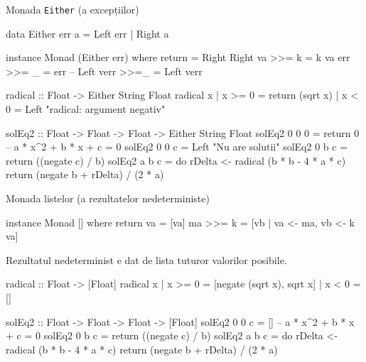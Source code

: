 \documentclass[xcolor=x11names,compress,10pt]{beamer}
\newcommand{\li}[1]{\lstinline$#1$}
\begin{document}
\begin{frame}[fragile]{Monada \li{Either} (a excepțiilor)}

\begin{asciihs}
data Either err a = Left err | Right a
\end{asciihs}

\pause

\begin{asciihs}
instance Monad (Either err) where
  return = Right
  Right va >>= k  = k va
  err     >>= _  = err   -- Left verr >>=_ = Left verr
\end{asciihs}

\pause

\begin{asciihs}
radical :: Float -> Either String Float
radical x | x >= 0 = return (sqrt x)
          | x < 0  = Left "radical: argument negativ"

solEq2 :: Float -> Float -> Float -> Either String Float
solEq2 0 0 0 = return 0          -- a * x^2 + b * x + c = 0
solEq2 0 0 c = Left "Nu are solutii"
solEq2 0 b c = return ((negate c) / b)
solEq2 a b c = do 
                  rDelta <- radical (b * b - 4 * a * c)
                  return (negate b + rDelta) / (2 * a)
\end{asciihs}
\end{frame}


\begin{frame}[fragile]{Monada listelor (a rezultatelor nedeterministe)}


\begin{asciihs}
instance Monad [] where
  return va = [va]
  ma >>= k = [vb | va <- ma, vb <- k va]
\end{asciihs}
Rezultatul nedeterminist e dat de lista tuturor valorilor posibile.

\pause

\begin{asciihs}
radical :: Float -> [Float]
radical x | x >= 0 = [negate (sqrt x), sqrt x]
          | x < 0  = []

solEq2 :: Float -> Float -> Float -> [Float]
solEq2 0 0 c = []               -- a * x^2 + b * x + c = 0
solEq2 0 b c = return ((negate c) / b)
solEq2 a b c = do
                  rDelta <- radical (b * b - 4 * a * c)
                  return (negate b + rDelta) / (2 * a)
\end{asciihs}

\end{frame}
\end{document}

